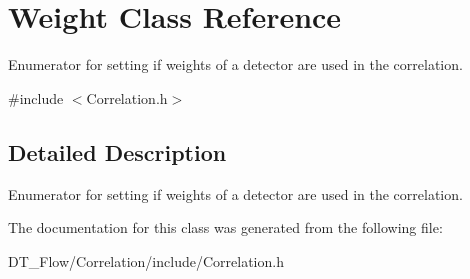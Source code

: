 \hypertarget{classWeight}{}\section{Weight Class Reference}
\label{classWeight}


Enumerator for setting if weights of a detector are used in the correlation.  




{\ttfamily \#include $<$Correlation.\+h$>$}



\subsection{Detailed Description}
Enumerator for setting if weights of a detector are used in the correlation. 

The documentation for this class was generated from the following file\+:\begin{DoxyCompactItemize}
\item 
D\+T\+\_\+\+Flow/\+Correlation/include/Correlation.\+h\end{DoxyCompactItemize}
